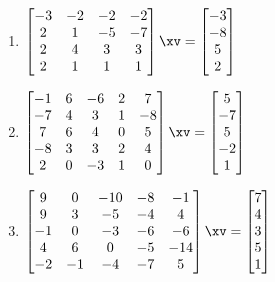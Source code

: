 \begin{exercise}
\begin{enumerate}
\item \(\begin{bmatrix} -3&-2&-2&-2
\\2&1&-5&-7
\\2&4&3&3
\\2&1&1&1 \end{bmatrix}\xv
=\begin{bmatrix} -3
\\-8
\\5
\\2 \end{bmatrix}\)
\setbox\ajrqrbox\hbox{}%
\marginpar{\usebox{\ajrqrbox\\[2ex]}}%


\item \(\begin{bmatrix} -1&6&-6&2&7
\\-7&4&3&1&-8
\\7&6&4&0&5
\\-8&3&3&2&4
\\2&0&-3&1&0 \end{bmatrix}\xv
=\begin{bmatrix} 5
\\-7
\\5
\\-2
\\1 \end{bmatrix}\)
\setbox\ajrqrbox\hbox{}%
\marginpar{\usebox{\ajrqrbox\\[2ex]}}%

\item \(\begin{bmatrix} 9&0&-10&-8&-1
\\9&3&-5&-4&4
\\-1&0&-3&-6&-6
\\4&6&0&-5&-14
\\-2&-1&-4&-7&5 \end{bmatrix}\xv
=\begin{bmatrix} 7
\\4
\\3
\\5
\\1 \end{bmatrix}\)
\setbox\ajrqrbox\hbox{}%
\marginpar{\usebox{\ajrqrbox\\[2ex]}}%


\end{enumerate}
\end{exercise}



